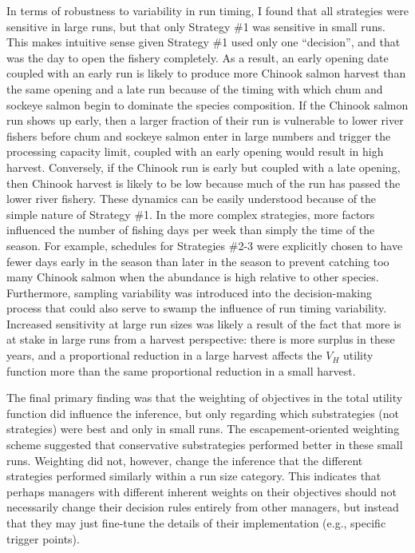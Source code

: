 \documentclass[12pt,]{book}
\theoremstyle{definition}
\theoremstyle{definition}
\theoremstyle{definition}
\theoremstyle{remark}
\begin{document}
In terms of robustness to variability in run timing, I found that all
strategies were sensitive in large runs, but that only Strategy \#1 was
sensitive in small runs. This makes intuitive sense given Strategy \#1
used only one ``decision'', and that was the day to open the fishery
completely. As a result, an early opening date coupled with an early run
is likely to produce more Chinook salmon harvest than the same opening
and a late run because of the timing with which chum and sockeye salmon
begin to dominate the species composition. If the Chinook salmon run
shows up early, then a larger fraction of their run is vulnerable to
lower river fishers before chum and sockeye salmon enter in large
numbers and trigger the processing capacity limit, coupled with an early
opening would result in high harvest. Conversely, if the Chinook run is
early but coupled with a late opening, then Chinook harvest is likely to
be low because much of the run has passed the lower river fishery. These
dynamics can be easily understood because of the simple nature of
Strategy \#1. In the more complex strategies, more factors influenced
the number of fishing days per week than simply the time of the season.
For example, schedules for Strategies \#2-3 were explicitly chosen to
have fewer days early in the season than later in the season to prevent
catching too many Chinook salmon when the abundance is high relative to
other species. Furthermore, sampling variability was introduced into the
decision-making process that could also serve to swamp the influence of
run timing variability. Increased sensitivity at large run sizes was
likely a result of the fact that more is at stake in large runs from a
harvest perspective: there is more surplus in these years, and a
proportional reduction in a large harvest affects the \(V_H\) utility
function more than the same proportional reduction in a small harvest.

The final primary finding was that the weighting of objectives in the
total utility function did influence the inference, but only regarding
which substrategies (not strategies) were best and only in small runs.
The escapement-oriented weighting scheme suggested that conservative
substrategies performed better in these small runs. Weighting did not,
however, change the inference that the different strategies performed
similarly within a run size category. This indicates that perhaps
managers with different inherent weights on their objectives should not
necessarily change their decision rules entirely from other managers,
but instead that they may just fine-tune the details of their
implementation (e.g., specific trigger points).
\end{document}
